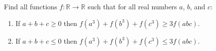 Find all functions $f:\mathbb{R}\to \mathbb{R}$ such that for all real numbers $a$, $b$, and $c$:
\begin{enumerate}[label=(\roman*)]
	\item If $a+b+c\ge 0$ then $f(a^3)+f(b^3)+f(c^3)\ge 3f(abc)$.
	\item If $a+b+c\le 0$ then $f(a^3)+f(b^3)+f(c^3)\le 3f(abc)$.
\end{enumerate}